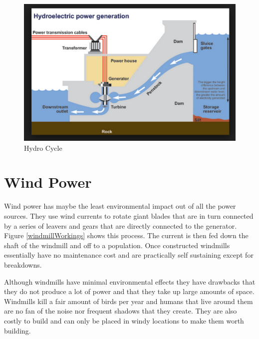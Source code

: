 \documentclass[msc,oneside]{ubcthesis}%
\begin{document}
\begin{figure}[hbt]\label{hydroCycle}
  \begin{center}
    \includegraphics[width=1\textwidth]{hydro}
    \caption[Hydro Cycle]{Hydro Cycle }
  \end{center}
\end{figure}

\newpage

\section{Wind Power}

Wind power has maybe the least environmental impact out of all the power sources. They use wind currents to 
rotate giant blades that are in turn connected by a series of leavers and gears that are directly connected 
to the generator. Figure \ref{windmillWorkings} shows this process. The current is then fed down the shaft 
of the windmill and off to a population. Once constructed windmills essentially have no maintenance cost 
and are practically self sustaining except for breakdowns. 

Although windmills have minimal environmental effects they have drawbacks that they do not produce a lot of 
power and that they take up large amounts of space. Windmills kill a fair amount of birds per year and 
humans that live around them are no fan of the noise nor frequent shadows that they create. They are also 
costly to build and can only be placed in windy locations to make them worth building. 
\bigskip
\end{document}
